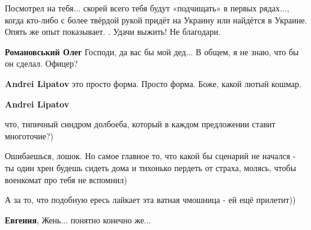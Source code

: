 \begin{itemize}
\begin{itemize}
Посмотрел на тебя... скорей всего тебя будут «подчищать» в первых рядах..., когда
кто-либо с более твёрдой рукой придёт на Украину или найдётся в Украине. Опять
же опыт показывает. \Smiley[1.0][yellow] . Удачи выжить! Не благодари. \Smiley[1.0][yellow]

 
\textbf{Романовський Олег} Господи, да вас бы мой дед... В общем, я не знаю, что бы он сделал. Офицер?

 
\textbf{Andrei Lipatov} это просто форма. Просто форма. Боже, какой лютый кошмар.

 
\textbf{Andrei Lipatov} 

что, типичный синдром долбоеба, который в каждом предложении ставит
многоточие?)

Ошибаешься, лошок. Но самое главное то, что какой бы сценарий не начался - ты
один хрен будешь сидеть дома и тихонько пердеть от страха, молясь, чтобы
военкомат про тебя не вспомнил)

А за то, что подобную ересь лайкает эта ватная чмошница - ей ещё прилетит))



 
\textbf{Евгения}, Жень... понятно конечно же... \Smiley[1.0][yellow]

 

\end{itemize}
\end{itemize}
